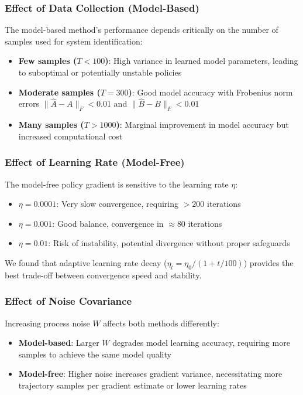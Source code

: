 \documentclass{report}
\begin{document}
\subsubsection{Effect of Data Collection (Model-Based)}

The model-based method's performance depends critically on the number of samples used for system identification:
\begin{itemize}
    \item \textbf{Few samples ($T < 100$)}: High variance in learned model parameters, leading to suboptimal or potentially unstable policies
    \item \textbf{Moderate samples ($T = 300$)}: Good model accuracy with Frobenius norm errors $\|\hat{A} - A\|_F < 0.01$ and $\|\hat{B} - B\|_F < 0.01$
    \item \textbf{Many samples ($T > 1000$)}: Marginal improvement in model accuracy but increased computational cost
\end{itemize}

\subsubsection{Effect of Learning Rate (Model-Free)}

The model-free policy gradient is sensitive to the learning rate $\eta$:
\begin{itemize}
    \item $\eta = 0.0001$: Very slow convergence, requiring $>200$ iterations
    \item $\eta = 0.001$: Good balance, convergence in $\approx 80$ iterations
    \item $\eta = 0.01$: Risk of instability, potential divergence without proper safeguards
\end{itemize}

We found that adaptive learning rate decay ($\eta_t = \eta_0 / (1 + t/100)$) provides the best trade-off between convergence speed and stability.

\subsubsection{Effect of Noise Covariance}

Increasing process noise $W$ affects both methods differently:
\begin{itemize}
    \item \textbf{Model-based}: Larger $W$ degrades model learning accuracy, requiring more samples to achieve the same model quality
    \item \textbf{Model-free}: Higher noise increases gradient variance, necessitating more trajectory samples per gradient estimate or lower learning rates
\end{itemize}
\end{document}
